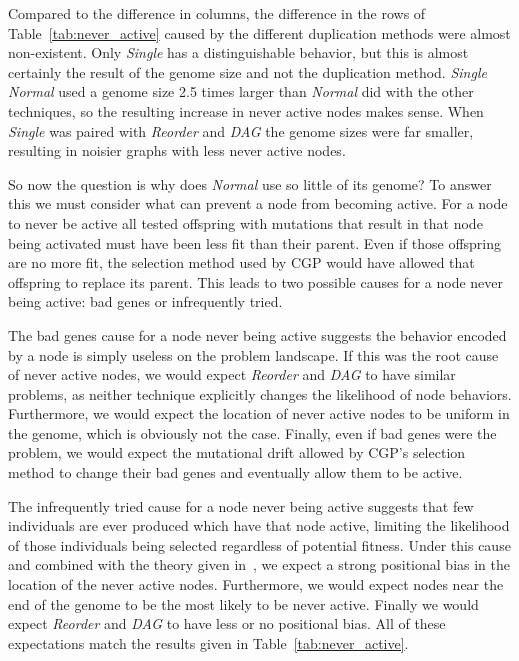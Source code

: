 \documentclass[journal]{IEEEtran}
\begin{document}
Compared to the difference in columns, the difference in the rows of Table~\ref{tab:never_active}
caused by the different duplication methods were almost non-existent.  Only
\emph{Single} has a distinguishable behavior, but this is almost certainly the result
of the genome size and not the duplication method.  \emph{Single Normal} used
a genome size 2.5 times larger than \emph{Normal} did with the other techniques,
so the resulting increase in never active nodes makes sense.  When \emph{Single}
was paired with \emph{Reorder} and \emph{DAG} the genome sizes were far smaller,
resulting in noisier graphs with less never active nodes.

So now the question is why does \emph{Normal} use so little of its genome?  To
answer this we must consider what can prevent a node from becoming active.  For
a node to never be active all tested offspring with mutations that result in that node being activated
must have been less fit than their parent.  Even if those offspring are no more fit, the selection method
used by CGP would have allowed that offspring to replace its parent.  This leads
to two possible causes for a node never being active: bad genes or infrequently tried.

The bad genes cause for a node never being active suggests the behavior encoded
by a node is simply useless on the problem landscape.  If this was the root cause
of never active nodes, we would expect \emph{Reorder} and \emph{DAG} to have
similar problems, as neither technique explicitly changes the likelihood of node
behaviors.  Furthermore, we would expect the location of never active nodes to be
uniform in the genome, which is obviously not the case.  Finally, even if bad
genes were the problem, we would expect the mutational drift allowed by CGP's
selection method to change their bad genes and eventually allow them to be active.

The infrequently tried cause for a node never being active suggests that few
individuals are ever produced which have that node active, limiting the likelihood
of those individuals being selected regardless of potential fitness.  Under this
cause and combined with the theory given in~\cite{goldman:2013:ordering}, we
expect a strong positional bias in the location of the never active nodes.  Furthermore,
we would expect nodes near the end of the genome to be the most likely to be never active.
Finally we would expect \emph{Reorder} and \emph{DAG} to have less or no positional bias.
All of these expectations match the results given in Table~\ref{tab:never_active}.
\end{document}
